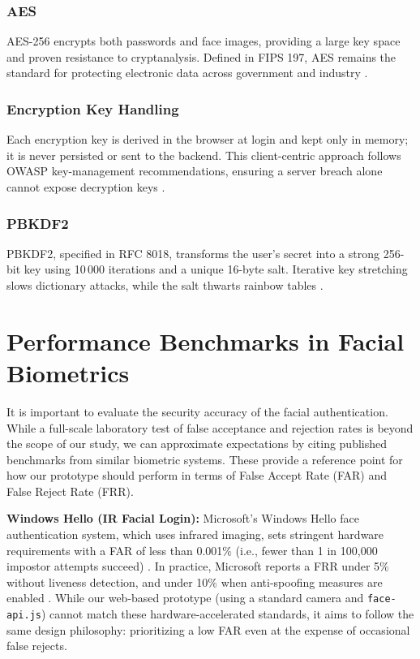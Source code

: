 \subsubsection{AES}  
AES-256 encrypts both passwords and face images, providing a large key space
and proven resistance to cryptanalysis.  Defined in FIPS 197, AES remains the standard for protecting electronic data across government and
industry \autocite{NISTFIPS197}. 

\subsubsection{Encryption Key Handling}  
Each encryption key is derived in the browser at login and kept only in
memory; it is never persisted or sent to the backend.  This client-centric
approach follows OWASP key-management recommendations, ensuring a server
breach alone cannot expose decryption keys
\autocite{OWASPKeyMgmt2025}. 

\subsubsection{PBKDF2}  
PBKDF2, specified in RFC 8018, transforms the user's secret into a strong
256-bit key using 10\,000 iterations and a unique 16-byte salt.  Iterative
key stretching slows dictionary attacks, while the salt thwarts rainbow
tables \autocite{RFC8018}.

\section{Performance Benchmarks in Facial Biometrics}
\label{sec:biometric-benchmarks}

It is important to evaluate the security accuracy of the facial authentication. While a full-scale laboratory test of false acceptance and rejection rates is beyond the scope of our study, we can approximate expectations by citing published benchmarks from similar biometric systems. These provide a reference point for how our prototype should perform in terms of False Accept Rate (FAR) and False Reject Rate (FRR).

\textbf{Windows Hello (IR Facial Login):} Microsoft's Windows Hello face authentication system, which uses infrared imaging, sets stringent hardware requirements with a FAR of less than 0.001\% (i.e., fewer than 1 in 100{,}000 impostor attempts succeed) \autocite{MicrosoftHelloDocs}. In practice, Microsoft reports a FRR under 5\% without liveness detection, and under 10\% when anti-spoofing measures are enabled \autocite{MicrosoftHelloDocs}. While our web-based prototype (using a standard camera and \texttt{face-api.js}) cannot match these hardware-accelerated standards, it aims to follow the same design philosophy: prioritizing a low FAR even at the expense of occasional false rejects.

